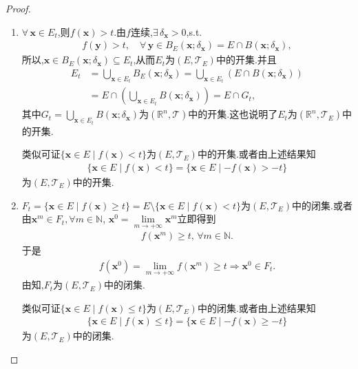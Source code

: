 \documentclass[../../main.tex]{subfiles}%
\begin{document}
\begin{proof}
\begin{enumerate}[(1)]
\item $\forall\,\boldsymbol{x}\in E_t$,则$f(\boldsymbol{x})>t$.由$f$连续,$\exists\,\delta_{\boldsymbol{x}}>0$,s.t.
\begin{align*}
f(\boldsymbol{y})>t,\quad \forall\,\boldsymbol{y}\in B_E(\boldsymbol{x};\delta_{\boldsymbol{x}})=E\cap B(\boldsymbol{x};\delta_{\boldsymbol{x}}),
\end{align*}
所以,$\boldsymbol{x}\in B_E(\boldsymbol{x};\delta_{\boldsymbol{x}})\subseteq E_t$,从而$E_t$为$(E,\mathscr{T}_E)$中的开集.并且
\begin{align*}
E_t&=\bigcup_{\boldsymbol{x}\in E_t}B_E(\boldsymbol{x};\delta_{\boldsymbol{x}})=\bigcup_{\boldsymbol{x}\in E_t}(E\cap B(\boldsymbol{x};\delta_{\boldsymbol{x}}))\\
&=E\cap\left(\bigcup_{\boldsymbol{x}\in E_t}B(\boldsymbol{x};\delta_{\boldsymbol{x}})\right)=E\cap G_t,
\end{align*}
其中$G_t=\bigcup_{\boldsymbol{x}\in E_t}B(\boldsymbol{x};\delta_{\boldsymbol{x}})$为$(\mathbb{R}^n,\mathscr{T})$中的开集.这也说明了$E_t$为$(\mathbb{R}^n,\mathscr{T}_E)$中的开集.

类似可证$\{\boldsymbol{x}\in E\mid f(\boldsymbol{x})<t\}$为$(E,\mathscr{T}_E)$中的开集.或者由上述结果知
\begin{align*}
\{\boldsymbol{x}\in E\mid f(\boldsymbol{x})<t\}=\{\boldsymbol{x}\in E\mid -f(\boldsymbol{x})>-t\}
\end{align*}
为$(E,\mathscr{T}_E)$中的开集.

\item $F_t=\{\boldsymbol{x}\in E\mid f(\boldsymbol{x})\geqslant t\}=E\setminus\{\boldsymbol{x}\in E\mid f(\boldsymbol{x})<t\}$为$(E,\mathscr{T}_E)$中的闭集.或者由$\boldsymbol{x}^m\in F_t,\forall m\in \mathbb{N}$,$\,\,\boldsymbol{x}^0=\lim\limits_{m\to+\infty}\boldsymbol{x}^m$立即得到
\begin{align*}
f(\boldsymbol{x}^m)\geqslant t,\,\forall m\in \mathbb{N}.
\end{align*}
于是
\begin{align*}
f(\boldsymbol{x}^0)=\lim\limits_{m\to+\infty}f(\boldsymbol{x}^m)\geqslant t\Longrightarrow \boldsymbol{x}^0\in F_t.
\end{align*}
由知,$F_t$为$(E,\mathscr{T}_E)$中的闭集.

类似可证$\{\boldsymbol{x}\in E\mid f(\boldsymbol{x})\leqslant t\}$为$(E,\mathscr{T}_E)$中的闭集.或者由上述结果知
\begin{align*}
\{\boldsymbol{x}\in E\mid f(\boldsymbol{x})\leqslant t\}=\{\boldsymbol{x}\in E\mid -f(\boldsymbol{x})\geqslant -t\}
\end{align*}
为$(E,\mathscr{T}_E)$中的闭集.
\end{enumerate}
\end{proof}
\end{document}
